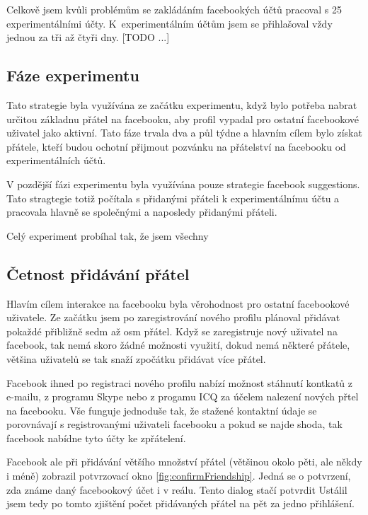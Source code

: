 \documentclass[thesis=M,czech]{FITthesis}[2013/05/10]
\begin{document}
Celkově jsem kvůli problémům se zakládáním facebookých účtů pracoval s 25 experimentálními účty. K~experimentálním účtům jsem se přihlašoval vždy jednou za tři až čtyři dny. [TODO ...]

\subsection{Fáze experimentu}

Tato strategie byla využívána ze začátku experimentu, když bylo potřeba nabrat určitou základnu přátel na facebooku, aby profil vypadal pro ostatní facebookové uživatel jako aktivní. Tato fáze trvala dva a půl týdne a hlavním cílem bylo získat přátele, kteří budou ochotní přijmout pozvánku na přátelství na facebooku od experimentálních účtů. 

V pozdější fázi experimentu byla využívána pouze strategie facebook suggestions. Tato stragtegie totiž počítala s přidanými přáteli k experimentálnímu účtu a pracovala hlavně se společnými a naposledy přidanými přáteli.

Celý experiment probíhal tak, že jsem všechny

\subsection{Četnost přidávání přátel}

Hlavím cílem interakce na facebooku byla věrohodnost pro ostatní facebookové uživatele. Ze začátku jsem po zaregistrování nového profilu plánoval přidávat pokaždé přibližně sedm až osm přátel. Když se zaregistruje nový uživatel na facebook, tak nemá skoro žádné možnosti využití, dokud nemá některé přátele, většina uživatelů se tak snaží zpočátku přidávat více přátel. 

Facebook ihned po registraci nového profilu nabízí možnost stáhnutí kontkatů z e-mailu, z programu Skype nebo z progamu ICQ za účelem nalezení nových přtel na facebooku. Vše funguje jednoduše tak, že stažené kontaktní údaje se porovnávají s registrovanými uživateli facebooku a pokud se najde shoda, tak facebook nabídne tyto účty ke zpřátelení.

Facebook ale při přidávání většího množství přátel (většinou okolo pěti, ale někdy i méně) zobrazil potvrzovací okno \ref{fig:confirmFriendship}. Jedná se o potvrzení, zda známe daný facebookový účet i v reálu. Tento dialog stačí potvrdit Ustálil jsem tedy po tomto zjištění počet přidávaných přátel na pět za jedno přihlášení.
\end{document}
